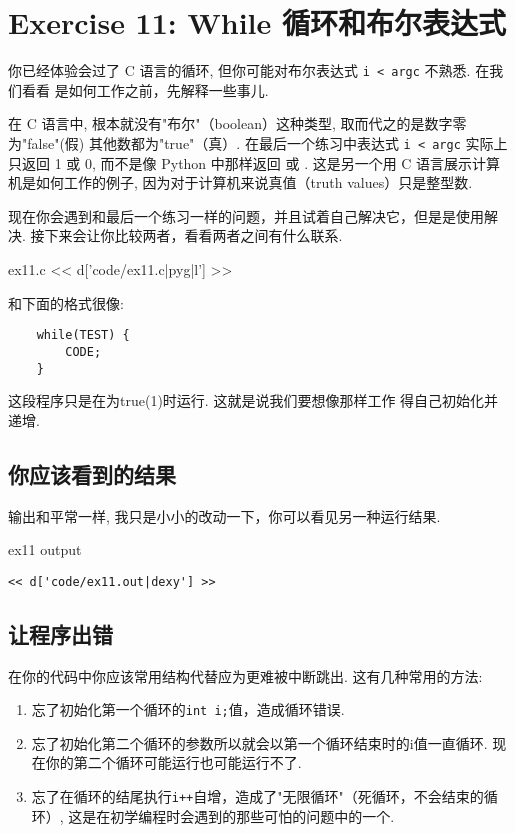 \chapter{Exercise 11: While 循环和布尔表达式}

你已经体验会过了 C 语言的循环, 但你可能对布尔表达式 \verb|i < argc| 不熟悉. 在我们看看  是如何工作之前，先解释一些事儿.

在 C 语言中, 根本就没有"布尔"（boolean）这种类型, 取而代之的是数字零为"false"(假) 其他数都为"true"（真）. 在最后一个练习中表达式 \verb|i < argc| 实际上只返回 1 或 0, 而不是像 Python 中那样返回  或 . 这是另一个用 C 语言展示计算机是如何工作的例子, 因为对于计算机来说真值（truth values）只是整型数.

现在你会遇到和最后一个练习一样的问题，并且试着自己解决它，但是是使用解决. 接下来会让你比较两者，看看两者之间有什么联系.

\begin{code}{ex11.c}
<< d['code/ex11.c|pyg|l'] >>
\end{code}

和下面的格式很像:

\begin{Verbatim}
    while(TEST) {
        CODE;
    }
\end{Verbatim}

这段程序只是在为true(1)时运行.
这就是说我们要想像那样工作
得自己初始化并递增.

\section{你应该看到的结果}

输出和平常一样, 我只是小小的改动一下，你可以看见另一种运行结果.

\begin{code}{ex11 output}
\begin{lstlisting}
<< d['code/ex11.out|dexy'] >>
\end{lstlisting}
\end{code}

\section{让程序出错}

在你的代码中你应该常用结构代替应为更难被中断跳出. 这有几种常用的方法:

\begin{enumerate}
\item 忘了初始化第一个循环的\verb|int i;|值，造成循环错误.
\item 忘了初始化第二个循环的参数所以就会以第一个循环结束时的i值一直循环. 现在你的第二个循环可能运行也可能运行不了.
\item 忘了在循环的结尾执行\verb|i++|自增，造成了"无限循环"（死循环，不会结束的循环）, 这是在初学编程时会遇到的那些可怕的问题中的一个.
\end{enumerate}

